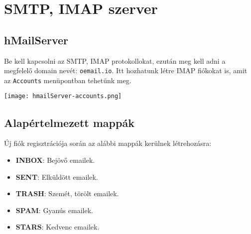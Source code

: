 ﻿\chapter{SMTP, IMAP szerver}

\section{hMailServer}
\begin{flushleft}
    Be kell kapcsolni az SMTP, IMAP protokollokat, ezután meg kell adni a megfelelő domain nevét: \verb|oemail.io|. Itt hozhatunk létre IMAP fiókokat is, amit az \verb|Accounts| menüpontban tehetünk meg.
    \begin{center}
        \texttt{[image: hmailServer-accounts.png]}
    \end{center}
\end{flushleft}

\section{Alapértelmezett mappák}
\begin{flushleft}
    Új fiók regisztrációja során az alábbi mappák kerülnek létrehozásra:
    \begin{itemize}
        \item \textbf{INBOX}: Bejövő emailek.
        \item \textbf{SENT}: Elküldött emailek.
        \item \textbf{TRASH}: Szemét, törölt emailek.
        \item \textbf{SPAM}: Gyanús emailek.
        \item \textbf{STARS}: Kedvenc emailek.
    \end{itemize}
\end{flushleft}